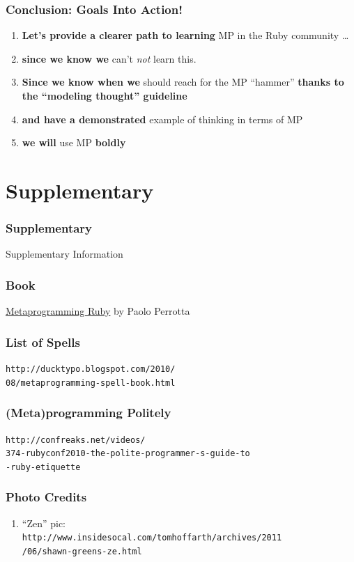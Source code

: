 \documentclass[slidestop,compress,mathserif]{beamer}
\begin{document}
\begin{frame}
	\frametitle{Conclusion:  Goals Into Action!}
	\begin{enumerate}
		\item \textbf{Let's provide a clearer path to learning} MP in the Ruby community \ldots
		\pause
		\item \textbf{since we know we} can't \emph{not} learn this.
		\pause
		\item \textbf{Since we know when we} should reach for the MP ``hammer'' \textbf{thanks to the ``modeling thought'' guideline}
		\pause
		\item \textbf{and have a demonstrated} example of thinking in terms of MP
		\pause
		\item \textbf{we will} use MP \textbf{boldly}
	\end{enumerate}
\end{frame}

\section{Supplementary} %
\label{sec:supplementary}

\begin{frame}
	\frametitle{Supplementary}
	\begin{center}
		Supplementary Information
	\end{center}
\end{frame}

\begin{frame}
	\frametitle{Book}
	\underline{Metaprogramming Ruby} by Paolo Perrotta
\end{frame}

\begin{frame}
	\frametitle{List of Spells}
	\texttt{http://ducktypo.blogspot.com/2010/\\08/metaprogramming-spell-book.html}
\end{frame}

\begin{frame}
	\frametitle{(Meta)programming Politely}
	\texttt{http://confreaks.net/videos/\\374-rubyconf2010-the-polite-programmer-s-guide-to\\-ruby-etiquette}
\end{frame}

\begin{frame}
	\frametitle{Photo Credits}
	\begin{enumerate}
		\footnotesize
		\item ``Zen'' pic:\\ \texttt{http://www.insidesocal.com/tomhoffarth/archives/2011\\
		 /06/shawn-greens-ze.html}
		\normalsize
	\end{enumerate}
\end{frame}
\end{document}
